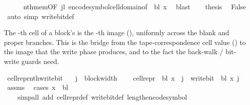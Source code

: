 \begin{isabellebody}
\ \ \ \ \isamarkupfalse%
\ nth{\isacharunderscore}{\kern0pt}mem{\isacharbrackleft}{\kern0pt}OF\ jl{\isacharbrackright}{\kern0pt}\ encode{\isacharunderscore}{\kern0pt}symbol{\isacharunderscore}{\kern0pt}cell{\isacharunderscore}{\kern0pt}domain{\isacharbrackleft}{\kern0pt}of\ {\isasymGamma}\ bl\ x{\isacharbrackright}{\kern0pt}\ \isamarkupfalse%
\ blast\isanewline
\ \ \isamarkupfalse%
\ {\isacharquery}{\kern0pt}thesis\ \isamarkupfalse%
\ False\ \isamarkupfalse%
\ {\isacharparenleft}{\kern0pt}auto\ simp{\isacharcolon}{\kern0pt}\ write{\isacharunderscore}{\kern0pt}bit{\isacharunderscore}{\kern0pt}def{\isacharparenright}{\kern0pt}\isanewline
{}\isamarkupfalse%
%
\endisatagproof
{\isafoldproof}%
%
\isadelimproof
%
\endisadelimproof
%
\begin{isamarkuptext}%
The -th cell of a block's  is the
  -th  image (), uniformly
  across the blank and proper branches.  This is the bridge from the
  tape-correspondence cell value () to the
   image that the write phase produces, and to the
   fact the back-walk / bit-write guards need.%
\end{isamarkuptext}\isamarkuptrue%
\isamarkupfalse%
\ cell{\isacharunderscore}{\kern0pt}repr{\isacharunderscore}{\kern0pt}nth{\isacharunderscore}{\kern0pt}write{\isacharunderscore}{\kern0pt}bit{\isacharcolon}{\kern0pt}\isanewline
\ \ \ {\isachardoublequoteopen}j\ {\isacharless}{\kern0pt}\ block{\isacharunderscore}{\kern0pt}width\ {\isasymGamma}{\isachardoublequoteclose}\isanewline
\ \ \ {\isachardoublequoteopen}cell{\isacharunderscore}{\kern0pt}repr\ {\isasymGamma}\ bl\ x\ {\isacharbang}{\kern0pt}\ j\ {\isacharequal}{\kern0pt}\ write{\isacharunderscore}{\kern0pt}bit\ {\isasymGamma}\ bl\ x\ j{\isachardoublequoteclose}\isanewline
%
\isadelimproof
\ \ %
\endisadelimproof
%
\isatagproof
{}\isamarkupfalse%
\ assms\ \isamarkupfalse%
\ {\isacharparenleft}{\kern0pt}cases\ {\isachardoublequoteopen}x\ {\isacharequal}{\kern0pt}\ bl{\isachardoublequoteclose}{\isacharparenright}{\kern0pt}\isanewline
\ \ \ \ {\isacharparenleft}{\kern0pt}simp{\isacharunderscore}{\kern0pt}all\ add{\isacharcolon}{\kern0pt}\ cell{\isacharunderscore}{\kern0pt}repr{\isacharunderscore}{\kern0pt}def\ write{\isacharunderscore}{\kern0pt}bit{\isacharunderscore}{\kern0pt}def\ length{\isacharunderscore}{\kern0pt}encode{\isacharunderscore}{\kern0pt}symbol{\isacharparenright}{\kern0pt}%

\end{isabellebody}
